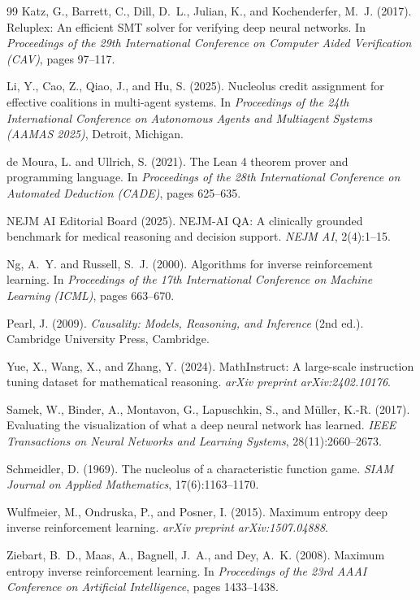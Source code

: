 \documentclass[12pt,a4paper]{article}
\begin{document}
\begin{thebibliography}{99}
Katz, G., Barrett, C., Dill, D.~L., Julian, K., and Kochenderfer, M.~J. (2017).
\newblock Reluplex: An efficient SMT solver for verifying deep neural networks.
\newblock In \emph{Proceedings of the 29th International Conference on Computer Aided Verification (CAV)}, pages 97--117.

Li, Y., Cao, Z., Qiao, J., and Hu, S. (2025).
\newblock Nucleolus credit assignment for effective coalitions in multi-agent systems.
\newblock In \emph{Proceedings of the 24th International Conference on Autonomous Agents and Multiagent Systems (AAMAS 2025)}, Detroit, Michigan.

de Moura, L. and Ullrich, S. (2021).
\newblock The Lean 4 theorem prover and programming language.
\newblock In \emph{Proceedings of the 28th International Conference on Automated Deduction (CADE)}, pages 625--635.

NEJM AI Editorial Board (2025).
\newblock NEJM-AI QA: A clinically grounded benchmark for medical reasoning and decision support.
\newblock \emph{NEJM AI}, 2(4):1--15.

Ng, A.~Y. and Russell, S.~J. (2000).
\newblock Algorithms for inverse reinforcement learning.
\newblock In \emph{Proceedings of the 17th International Conference on Machine Learning (ICML)}, pages 663--670.

Pearl, J. (2009).
\newblock \emph{Causality: Models, Reasoning, and Inference} (2nd ed.).
\newblock Cambridge University Press, Cambridge.

Yue, X., Wang, X., and Zhang, Y. (2024).
\newblock MathInstruct: A large-scale instruction tuning dataset for mathematical reasoning.
\newblock \emph{arXiv preprint arXiv:2402.10176}.

Samek, W., Binder, A., Montavon, G., Lapuschkin, S., and M\"{u}ller, K.-R. (2017).
\newblock Evaluating the visualization of what a deep neural network has learned.
\newblock \emph{IEEE Transactions on Neural Networks and Learning Systems}, 28(11):2660--2673.

Schmeidler, D. (1969).
\newblock The nucleolus of a characteristic function game.
\newblock \emph{SIAM Journal on Applied Mathematics}, 17(6):1163--1170.

Wulfmeier, M., Ondruska, P., and Posner, I. (2015).
\newblock Maximum entropy deep inverse reinforcement learning.
\newblock \emph{arXiv preprint arXiv:1507.04888}.

Ziebart, B.~D., Maas, A., Bagnell, J.~A., and Dey, A.~K. (2008).
\newblock Maximum entropy inverse reinforcement learning.
\newblock In \emph{Proceedings of the 23rd AAAI Conference on Artificial Intelligence}, pages 1433--1438.

\end{thebibliography}
\end{document}
